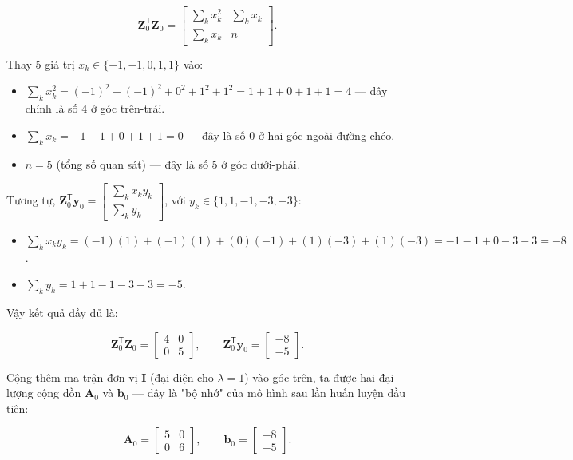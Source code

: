 \documentclass[12pt]{article}
\begin{document}
\[
\boldsymbol{Z}_0^{\mathsf{T}}\boldsymbol{Z}_0
=
\begin{bmatrix}
\sum_k x_k^2 & \sum_k x_k\\
\sum_k x_k & n
\end{bmatrix}.
\]

Thay 5 giá trị $x_k \in \{-1,-1,0,1,1\}$ vào:

\begin{itemize}
\item $\sum_k x_k^2 = (-1)^2+(-1)^2+0^2+1^2+1^2 = 1+1+0+1+1 = 4$ — đây chính là số 4 ở góc trên-trái.
\item $\sum_k x_k = -1-1+0+1+1 = 0$ — đây là số 0 ở hai góc ngoài đường chéo.
\item $n = 5$ (tổng số quan sát) — đây là số 5 ở góc dưới-phải.
\end{itemize}

Tương tự, $\boldsymbol{Z}_0^{\mathsf{T}}\boldsymbol{y}_0 = \begin{bmatrix}\sum_k x_k y_k\\ \sum_k y_k\end{bmatrix}$, với $y_k \in \{1,1,-1,-3,-3\}$:

\begin{itemize}
\item $\sum_k x_k y_k = (-1)(1)+(-1)(1)+(0)(-1)+(1)(-3)+(1)(-3) = -1-1+0-3-3 = -8$.
\item $\sum_k y_k = 1+1-1-3-3 = -5$.
\end{itemize}

Vậy kết quả đầy đủ là:

\[
\boldsymbol{Z}_0^{\mathsf{T}}\boldsymbol{Z}_0
=
\begin{bmatrix}
4 & 0\\
0 & 5
\end{bmatrix},
\qquad
\boldsymbol{Z}_0^{\mathsf{T}}\boldsymbol{y}_0
=
\begin{bmatrix}
-8\\
-5
\end{bmatrix}.
\]

Cộng thêm ma trận đơn vị $\boldsymbol{I}$ (đại diện cho $\lambda=1$) vào góc trên, ta được hai đại lượng cộng dồn $\boldsymbol{A}_0$ và $\boldsymbol{b}_0$ — đây là "bộ nhớ" của mô hình sau lần huấn luyện đầu tiên:

\[
\boldsymbol{A}_0
=
\begin{bmatrix}
5 & 0\\
0 & 6
\end{bmatrix},
\qquad
\boldsymbol{b}_0
=
\begin{bmatrix}
-8\\
-5
\end{bmatrix}.
\]
\end{document}
